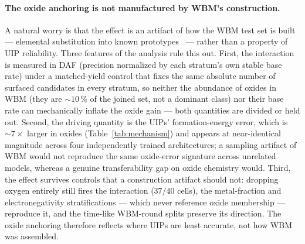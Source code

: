 \documentclass[11pt]{article}
\begin{document}
\paragraph{The oxide anchoring is not manufactured by WBM's construction.} A natural worry is
that the effect is an artifact of how the WBM test set is built --- elemental substitution into
known prototypes~\citep{wang2021} --- rather than a property of UIP reliability. Three features
of the analysis rule this out. First, the interaction is measured in DAF (precision normalized
by each stratum's own stable base rate) under a matched-yield control that fixes the same
absolute number of surfaced candidates in every stratum, so neither the abundance of
oxides in WBM (they are $\sim\!10\,\%$ of the joined set, not a dominant class) nor their base
rate can mechanically inflate the oxide gain --- both quantities are divided or held out.
Second, the driving quantity is the UIPs' formation-energy error, which is $\sim\!7\times$ larger
in oxides (Table~\ref{tab:mechanism}) and appears at near-identical magnitude across four
independently trained architectures; a sampling artifact of WBM would not reproduce the same
oxide-error signature across unrelated models, whereas a genuine transferability gap on oxide
chemistry would. Third, the effect survives controls that a construction artifact should not:
dropping oxygen entirely still fires the interaction ($37/40$ cells), the metal-fraction and
electronegativity stratifications --- which never reference oxide membership --- reproduce it,
and the time-like WBM-round splits preserve its direction. The oxide anchoring therefore reflects
where UIPs are least accurate, not how WBM was assembled.
\end{document}
